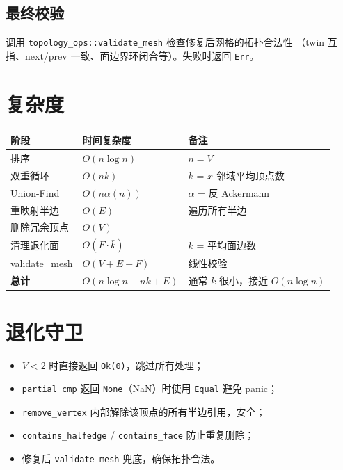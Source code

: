 \documentclass[11pt,a4paper]{article}
\begin{document}
\subsection{最终校验}

调用 \texttt{topology\_ops::validate\_mesh} 检查修复后网格的拓扑合法性
（twin 互指、next/prev 一致、面边界环闭合等）。失败时返回 \texttt{Err}。

\section{复杂度}

\begin{center}
\renewcommand{\arraystretch}{1.18}
\begin{tabular}{@{}lll@{}}
  \toprule
  \textbf{阶段} & \textbf{时间复杂度} & \textbf{备注} \\
  \midrule
  排序            & $O(n \log n)$              & $n = V$ \\
  双重循环        & $O(n k)$                   & $k$ = $x$ 邻域平均顶点数 \\
  Union-Find     & $O(n \alpha(n))$           & $\alpha$ = 反 Ackermann \\
  重映射半边     & $O(E)$                     & 遍历所有半边 \\
  删除冗余顶点   & $O(V)$                     & \\
  清理退化面     & $O(F \cdot \bar{k})$       & $\bar{k}$ = 平均面边数 \\
  validate\_mesh & $O(V + E + F)$             & 线性校验 \\
  \midrule
  \textbf{总计}  & $O(n \log n + n k + E)$    & 通常 $k$ 很小，接近 $O(n \log n)$ \\
  \bottomrule
\end{tabular}
\end{center}

\section{退化守卫}

\begin{itemize}
  \item $V < 2$ 时直接返回 \texttt{Ok(0)}，跳过所有处理；
  \item \texttt{partial\_cmp} 返回 \texttt{None}（NaN）时使用 \texttt{Equal}
        避免 panic；
  \item \texttt{remove\_vertex} 内部解除该顶点的所有半边引用，安全；
  \item \texttt{contains\_halfedge} / \texttt{contains\_face} 防止重复删除；
  \item 修复后 \texttt{validate\_mesh} 兜底，确保拓扑合法。
\end{itemize}
\end{document}
